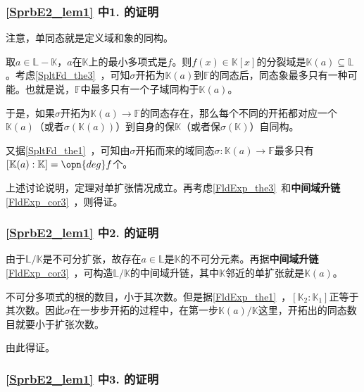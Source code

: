 \subsubsection{\autoref{SprbE2_lem1} 中1. 的证明}



注意，单同态就是定义域和象的同构。

取$a\in\mathbb{L}-\mathbb{K}$，$a$在$\mathbb{K}$上的最小多项式是$f$。则$f(x)\in\mathbb{K}[x]$的分裂域是$\mathbb{K}(a)\subseteq\mathbb{L}$。考虑\autoref{SpltFd_the3}~，可知$\sigma$开拓为$\mathbb{K}(a)$到$\mathbb{F}$的同态后，同态象最多只有一种可能。也就是说，$\mathbb{F}$中最多只有一个子域同构于$\mathbb{K}(a)$。

于是，如果$\sigma$开拓为$\mathbb{K}(a)\to\mathbb{F}$的同态存在，那么每个不同的开拓都对应一个$\mathbb{K}(a)$（或者$\sigma(\mathbb{K}(a))$）到自身的保$\mathbb{K}$（或者保$\sigma(\mathbb{K})$）自同构。

又据\autoref{SpltFd_the1}~，可知由$\sigma$开拓而来的域同态$\sigma:\mathbb{K}(a)\to\mathbb{F}$最多只有$[\mathbb{K}(a):\mathbb{K}]=\opn{deg}f$个。

上述讨论说明，定理对单扩张情况成立。再考虑\autoref{FldExp_the3}~和\textbf{中间域升链}\autoref{FldExp_cor3}~，则得证。



\subsubsection{\autoref{SprbE2_lem1} 中2. 的证明}

由于$\mathbb{L}/\mathbb{K}$是不可分扩张，故存在$a\in\mathbb{L}$是$\mathbb{K}$的不可分元素。再据\textbf{中间域升链}\autoref{FldExp_cor3}~，可构造$\mathbb{L}/\mathbb{K}$的中间域升链，其中$\mathbb{K}$邻近的单扩张就是$\mathbb{K}(a)$。

不可分多项式的根的数目，小于其次数。但是据\autoref{FldExp_the1}~，$[\mathbb{K}_2:\mathbb{K}_1]$正等于其次数。因此$\sigma$在一步步开拓的过程中，在第一步$\mathbb{K}(a)/\mathbb{K}$这里，开拓出的同态数目就要小于扩张次数。

由此得证。


\subsubsection{\autoref{SprbE2_lem1} 中3. 的证明}

